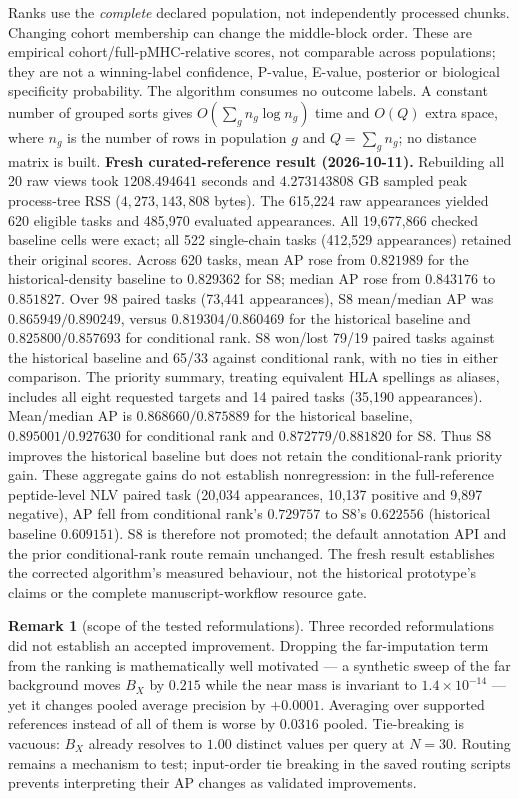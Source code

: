 \documentclass[10pt,a4paper]{article}
\theoremstyle{definition}
\newtheorem{remark}{Remark}
\begin{document}
Ranks use the \emph{complete} declared population, not independently processed chunks. Changing
cohort membership can change the middle-block order. These are empirical cohort/full-pMHC-relative
scores, not comparable across populations; they are not a winning-label confidence, P-value,
E-value, posterior or biological specificity probability. The algorithm consumes no outcome labels.
A constant number of grouped sorts gives $O(\sum_g n_g\log n_g)$ time and $O(Q)$ extra space,
where $n_g$ is the number of rows in population $g$ and $Q=\sum_g n_g$; no distance matrix is built.
\textbf{Fresh curated-reference result (2026-10-11).} Rebuilding all 20 raw views took
$1208.494641$ seconds and $4.273143808$ GB sampled peak process-tree RSS
($4{,}273{,}143{,}808$ bytes). The 615,224 raw appearances yielded 620 eligible tasks and
485,970 evaluated appearances. All 19,677,866 checked baseline cells were exact; all 522
single-chain tasks (412,529 appearances) retained their original scores.
Across 620 tasks, mean AP rose from $0.821989$ for the historical-density baseline to $0.829362$
for S8; median AP rose from $0.843176$ to $0.851827$. Over 98 paired tasks (73,441 appearances),
S8 mean/median AP was $0.865949/0.890249$, versus $0.819304/0.860469$ for the historical baseline
and $0.825800/0.857693$ for conditional rank. S8 won/lost 79/19 paired tasks against the
historical baseline and 65/33 against conditional rank, with no ties in either comparison.
The priority summary, treating equivalent HLA spellings as aliases, includes all eight requested
targets and 14 paired tasks (35,190 appearances). Mean/median AP is $0.868660/0.875889$ for the
historical baseline, $0.895001/0.927630$ for conditional rank and $0.872779/0.881820$ for S8.
Thus S8 improves the historical baseline but does not retain the conditional-rank priority gain.
These aggregate gains do not establish nonregression: in the full-reference peptide-level NLV
paired task (20,034 appearances, 10,137 positive and 9,897 negative), AP fell from conditional
rank's $0.729757$ to S8's $0.622556$ (historical baseline $0.609151$).
S8 is therefore not promoted; the default annotation API and the prior conditional-rank route
remain unchanged. The fresh result establishes the corrected algorithm's measured behaviour,
not the historical prototype's claims or the complete manuscript-workflow resource gate.

\begin{remark}[scope of the tested reformulations]\label{rem:exhausted}
Three recorded reformulations did not establish an accepted improvement. Dropping the
far-imputation term from the ranking is mathematically well motivated --- a synthetic sweep of the
far background moves $B_X$ by $0.215$ while the near mass is invariant to $1.4\times10^{-14}$ ---
yet it changes pooled average precision by $+0.0001$. Averaging over supported references instead of
all of them is worse by $0.0316$ pooled. Tie-breaking is vacuous: $B_X$ already resolves to $1.00$
distinct values per query at $N=30$. Routing remains a mechanism to test; input-order tie breaking in the saved routing scripts
prevents interpreting their AP changes as validated improvements.
\end{remark}
\end{document}
